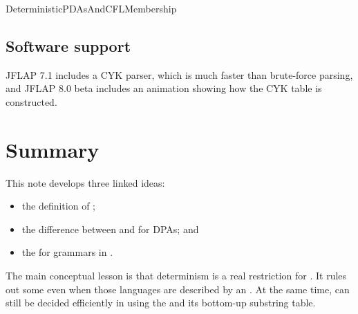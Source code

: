 \documentclass[hidelinks]{article}
\begin{document}
\begin{smodule}[title={Deterministic PDAs and CFL Membership}]{DeterministicPDAsAndCFLMembership}
\subsection{Software support}

JFLAP 7.1 includes a CYK parser, which is much faster than brute-force parsing, and JFLAP 8.0 beta includes an animation showing how the CYK table is constructed.

\section{Summary}

This note develops three linked ideas:
\begin{itemize}
    \item the definition of ;
    \item the difference between  and  for DPAs; and
    \item the  for grammars in .
\end{itemize}

The main conceptual lesson is that determinism is a real restriction for .
It rules out some  even when those languages are described by an .
At the same time,  can still be decided efficiently in  using the  and its bottom-up substring table.

\end{smodule}
\end{document}
